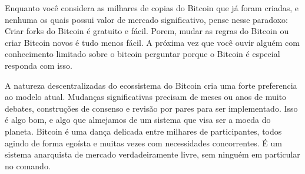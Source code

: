 Enquanto você considera as milhares de copias do Bitcoin que já foram criadas, e nenhuma os quais possui valor de mercado significativo, pense nesse paradoxo:
Criar forks do Bitcoin é gratuito e fácil. Porem, mudar as regras do Bitcoin ou criar Bitcoin novos é tudo menos fácil. 
A próxima vez que você ouvir alguém com conhecimento limitado sobre o bitcoin perguntar porque o Bitcoin é especial responda com isso.


A natureza descentralizadas do ecossistema do Bitcoin cria uma forte preferencia ao modelo atual. 
Mudanças significativas precisam de meses ou anos de muito debates, construções de consenso e revisão por pares para ser implementado.
Isso é algo bom, e algo que almejamos de um sistema que visa ser a moeda do planeta.
Bitcoin é uma dança delicada entre milhares de participantes, todos agindo de forma egoísta e muitas vezes com necessidades concorrentes.
É um sistema anarquista de mercado verdadeiramente livre, sem ninguém em particular no comando.
